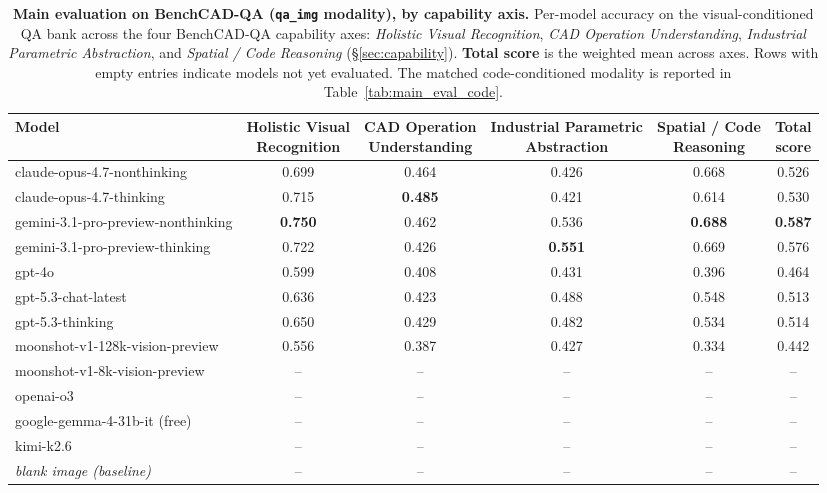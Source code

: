 \begin{table}[t]
\centering
\small
\setlength{\tabcolsep}{5pt}
\renewcommand{\arraystretch}{1.15}
\caption{\textbf{Main evaluation on BenchCAD-QA (\texttt{qa\_img} modality), by capability axis.} Per-model accuracy on the visual-conditioned QA bank across the four BenchCAD-QA capability axes: \emph{Holistic Visual Recognition}, \emph{CAD Operation Understanding}, \emph{Industrial Parametric Abstraction}, and \emph{Spatial / Code Reasoning} (\S\ref{sec:capability}). \textbf{Total score} is the weighted mean across axes. Rows with empty entries indicate models not yet evaluated. The matched code-conditioned modality is reported in Table~\ref{tab:main_eval_code}.}
\label{tab:main_eval}
\begin{tabular}{l c c c c c}
\toprule
Model
 & \shortstack{Holistic Visual\\Recognition}
 & \shortstack{CAD Operation\\Understanding}
 & \shortstack{Industrial Parametric\\Abstraction}
 & \shortstack{Spatial / Code\\Reasoning}
 & \shortstack{Total\\score} \\
\midrule
claude-opus-4.7-nonthinking         & 0.699 & 0.464 & 0.426 & 0.668 & 0.526 \\
claude-opus-4.7-thinking            & 0.715 & \textbf{0.485} & 0.421 & 0.614 & 0.530 \\
gemini-3.1-pro-preview-nonthinking  & \textbf{0.750} & 0.462 & 0.536 & \textbf{0.688} & \textbf{0.587} \\
gemini-3.1-pro-preview-thinking     & 0.722 & 0.426 & \textbf{0.551} & 0.669 & 0.576 \\
gpt-4o                              & 0.599 & 0.408 & 0.431 & 0.396 & 0.464 \\
gpt-5.3-chat-latest                 & 0.636 & 0.423 & 0.488 & 0.548 & 0.513 \\
gpt-5.3-thinking                    & 0.650 & 0.429 & 0.482 & 0.534 & 0.514 \\
moonshot-v1-128k-vision-preview     & 0.556 & 0.387 & 0.427 & 0.334 & 0.442 \\
moonshot-v1-8k-vision-preview       & --    & --    & --    & --    & --    \\
openai-o3                           & --    & --    & --    & --    & --    \\
google-gemma-4-31b-it (free)        & --    & --    & --    & --    & --    \\
kimi-k2.6                           & --    & --    & --    & --    & --    \\
\midrule
\textit{blank image (baseline)}     & --    & --    & --    & --    & --    \\
\bottomrule
\end{tabular}
\end{table}
